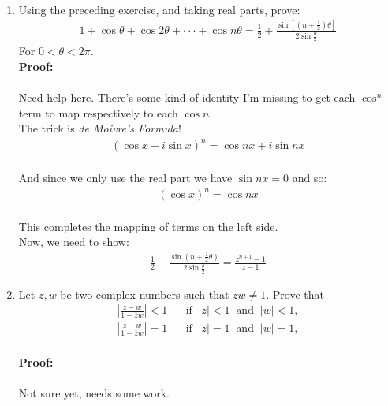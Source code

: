 \begin{enumerate}
	\item Using the preceding exercise, and taking real parts, prove:
	\begin{align*}
		1 + \cos\theta + \cos2\theta + \cdot\cdot\cdot + \cos n\theta = \frac{1}{2} + \frac{\sin[(n + \frac{1}{2})\theta]}{2\sin{\frac{\theta}{2}}}
	\end{align*}
	For $0 < \theta < 2\pi.$ \\

	\textbf{Proof:} \\
	\\
	Need help here. There's some kind of identity I'm missing to get each $\cos^n$ term to map respectively to each $\cos n.$ \\

	The trick is \emph{de Moivre's Formula}!
	\begin{align*}
		\left( \cos x + i \sin x \right)^n = \cos nx + i \sin nx \\
	\end{align*}

	And since we only use the real part we have $\sin nx = 0$ and so:
	\begin{align*}
		\left( \cos x \right)^n = \cos nx \\
	\end{align*}

	This completes the mapping of terms on the left side. \\
	Now, we need to show:
	\begin{align*}
		\frac{1}{2} + \frac{\sin (n + \frac{1}{2}\theta)}{2 \sin \frac{\theta}{2}} = \frac{z^{n + 1} - 1}{z - 1}
	\end{align*}

	\item Let $z, w$ be two complex numbers such that $\bar{z}w \neq 1.$ Prove that
	\begin{align*}
		\left| \frac{z - w}{1 - \bar{z}w} \right| < 1 \;\;\;\;\;\; \text{if} \;\; |z| < 1 \;\; \text{and} \;\; |w| < 1, \\
		\left| \frac{z - w}{1 - \bar{z}w} \right| = 1 \;\;\;\;\;\; \text{if} \;\; |z| = 1 \;\; \text{and} \;\; |w| = 1, \\
	\end{align*}
	
	\textbf{Proof:} \\
	\\
	Not sure yet, needs some work.

\end{enumerate}

